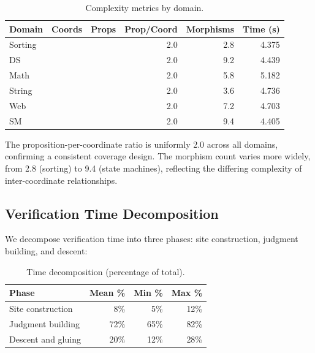 \documentclass[11pt]{article}
\begin{document}
\begin{table}[H]
\centering
\caption{Complexity metrics by domain.}\label{tab:complexity}
\small
\begin{tabular}{@{}l r r r r r@{}}
\toprule
\textbf{Domain} & \textbf{Coords} & \textbf{Props}
  & \textbf{Prop/Coord} & \textbf{Morphisms}
  & \textbf{Time (s)} \\
\midrule
Sorting & \expDomainSortAvgCoords{} & \expDomainSortAvgProps{}
  & 2.0 & 2.8 & 4.375 \\
DS      & \expDomainDsAvgCoords{} & \expDomainDsAvgProps{}
  & 2.0 & 9.2 & 4.439 \\
Math    & \expDomainMathAvgCoords{} & \expDomainMathAvgProps{}
  & 2.0 & 5.8 & 5.182 \\
String  & \expDomainStrAvgCoords{} & \expDomainStrAvgProps{}
  & 2.0 & 3.6 & 4.736 \\
Web     & \expDomainWebAvgCoords{} & \expDomainWebAvgProps{}
  & 2.0 & 7.2 & 4.703 \\
SM      & \expDomainSmAvgCoords{} & \expDomainSmAvgProps{}
  & 2.0 & 9.4 & 4.405 \\
\bottomrule
\end{tabular}
\end{table}

The proposition-per-coordinate ratio is uniformly 2.0 across all
domains, confirming a consistent coverage design.  The morphism count
varies more widely, from 2.8 (sorting) to 9.4 (state machines),
reflecting the differing complexity of inter-coordinate relationships.

\subsection{Verification Time Decomposition}

We decompose verification time into three phases: site construction,
judgment building, and descent:

\begin{table}[H]
\centering
\caption{Time decomposition (percentage of total).}\label{tab:decomp}
\begin{tabular}{@{}l r r r@{}}
\toprule
\textbf{Phase} & \textbf{Mean \%} & \textbf{Min \%} & \textbf{Max \%} \\
\midrule
Site construction     &  8\% &  5\% & 12\% \\
Judgment building     & 72\% & 65\% & 82\% \\
Descent and gluing    & 20\% & 12\% & 28\% \\
\bottomrule
\end{tabular}
\end{table}
\end{document}
